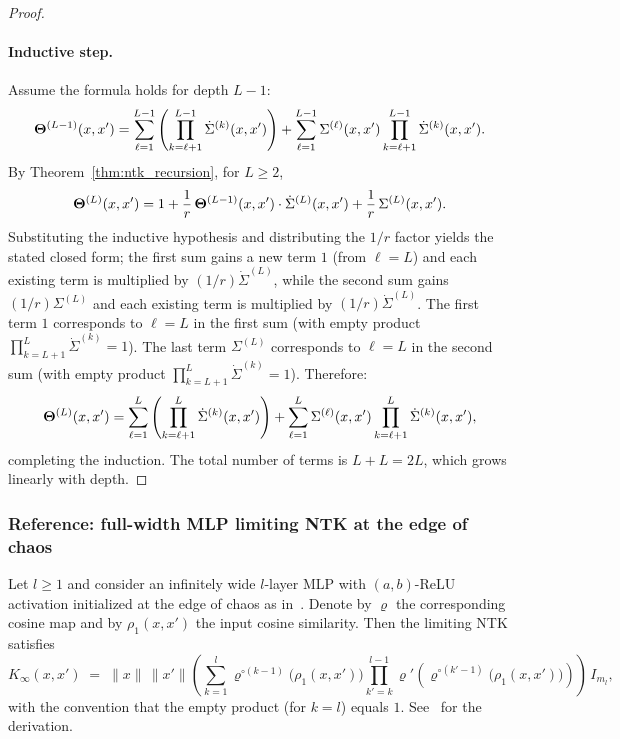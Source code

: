 \begin{proof}
\paragraph{Inductive step.}
Assume the formula holds for depth \( L-1 \):
\begin{align}
\boldsymbol{\Theta}^{(L-1)}(x,x') = \sum_{\ell=1}^{L-1} \left(\prod_{k=\ell+1}^{L-1} \dot{\Sigma}^{(k)}(x,x')\right) + \sum_{\ell=1}^{L-1} \Sigma^{(\ell)}(x,x') \prod_{k=\ell+1}^{L-1} \dot{\Sigma}^{(k)}(x,x').
\end{align}
By Theorem~\ref{thm:ntk_recursion}, for \( L \ge 2 \),
\begin{align}
\boldsymbol{\Theta}^{(L)}(x,x') = 1 + \frac{1}{r}\,\boldsymbol{\Theta}^{(L-1)}(x,x')\cdot\dot{\Sigma}^{(L)}(x,x') + \frac{1}{r}\,\Sigma^{(L)}(x,x').
\end{align}
Substituting the inductive hypothesis and distributing the \( 1/r \) factor yields the stated closed form; the first sum gains a new term \( 1 \) (from \( \ell=L \)) and each existing term is multiplied by \( (1/r)\dot{\Sigma}^{(L)} \), while the second sum gains \( (1/r)\Sigma^{(L)} \) and each existing term is multiplied by \( (1/r)\dot{\Sigma}^{(L)} \).
The first term \( 1 \) corresponds to \( \ell=L \) in the first sum (with empty product \( \prod_{k=L+1}^{L} \dot{\Sigma}^{(k)} = 1 \)). The last term \( \Sigma^{(L)} \) corresponds to \( \ell=L \) in the second sum (with empty product \( \prod_{k=L+1}^{L} \dot{\Sigma}^{(k)} = 1 \)). Therefore:
\begin{align}
\boldsymbol{\Theta}^{(L)}(x,x') = \sum_{\ell=1}^{L} \left(\prod_{k=\ell+1}^{L} \dot{\Sigma}^{(k)}(x,x')\right) + \sum_{\ell=1}^{L} \Sigma^{(\ell)}(x,x') \prod_{k=\ell+1}^{L} \dot{\Sigma}^{(k)}(x,x'),
\end{align}
completing the induction. The total number of terms is \( L + L = 2L \), which grows linearly with depth.
\end{proof}

\subsubsection{Reference: full-width MLP limiting NTK at the edge of chaos}
\label{appendix:mlp-eoc-ntk}
\begin{proposition}\label{prop:mlp-eoc-ntk-formula}
Let \(l\ge 1\) and consider an infinitely wide \(l\)-layer MLP with \((a,b)\)-ReLU activation initialized at the edge of chaos as in~\cite{terjek2025mlpsateoc}. Denote by \(\varrho\) the corresponding cosine map and by \(\rho_1(x,x')\) the input cosine similarity. Then the limiting NTK satisfies
\[
K_\infty(x,x') \;=\; \|x\|\,\|x'\|\left(\sum_{k=1}^{l}\varrho^{\circ(k-1)}\!\big(\rho_1(x,x')\big)\prod_{k'=k}^{l-1}\varrho'\!\left(\varrho^{\circ(k'-1)}\!\big(\rho_1(x,x')\big)\right)\right)\,I_{m_l},
\]
with the convention that the empty product (for \(k=l\)) equals \(1\). See~\cite{terjek2025mlpsateoc} for the derivation.
\end{proposition}

